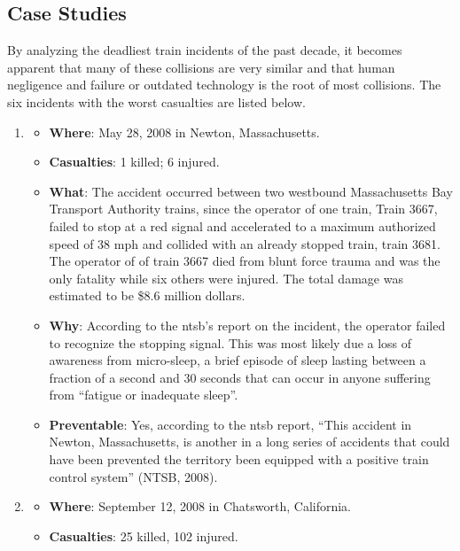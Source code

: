 \documentclass[11pt, titlepage]{article}
\begin{document}
\subsection{Case Studies}

By analyzing the deadliest train incidents of the past decade, it becomes
apparent that many of these collisions are very similar and that human negligence
and failure or outdated technology is the root of most collisions. The six
incidents with the worst casualties are listed below.

\begin{enumerate}
    \item
    \begin{itemize}
        \item \textbf{Where}: May 28, 2008 in Newton, Massachusetts.
        \item \textbf{Casualties}: 1 killed; 6 injured.
        \item \textbf{What}: The accident occurred between two westbound
        Massachusetts Bay Transport Authority trains, since the operator of one
        train, Train 3667, failed to stop at a red signal and accelerated to a
        maximum authorized speed of 38 mph and collided with an already stopped
        train, train 3681. The operator of  of train 3667 died from blunt force
        trauma and was the only fatality while six others were injured. The total
        damage was estimated to be \$8.6 million dollars.
        \item \textbf{Why}: According to the \gls{ntsb}’s report on the incident,
        the operator failed to recognize the stopping signal. This was most
        likely due a loss of awareness from micro-sleep, a brief episode of sleep
        lasting between a fraction of a second and 30 seconds that can occur in
        anyone suffering from ``fatigue or inadequate sleep''.
        \item \textbf{Preventable}: Yes, according to the \gls{ntsb} report,
        ``This accident in Newton, Massachusetts, is another in a long series of
        accidents that could have been prevented the territory been equipped with
        a positive train control system'' (NTSB, 2008).
    \end{itemize}
    \item
    \begin{itemize}
        \item \textbf{Where}: September 12, 2008 in Chatsworth, California.
        \item \textbf{Casualties}: 25 killed, 102 injured.

\end{itemize}
\end{enumerate}
\end{document}
